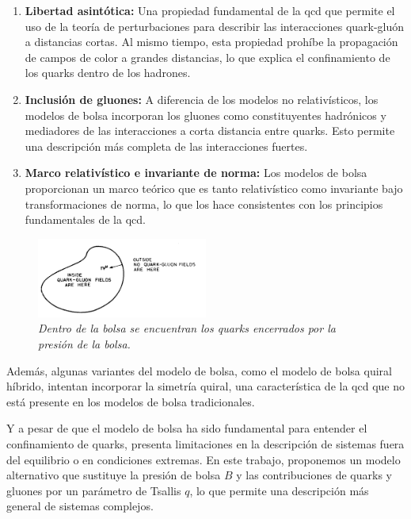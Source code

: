 \renewcommand{\labelenumi}{\alph{enumi})}

\begin{enumerate}
\item \textbf{Libertad asintótica:} Una propiedad fundamental de la \gls{qcd} que permite el uso de la teoría de perturbaciones para describir las interacciones quark-gluón a distancias cortas. Al mismo tiempo, esta propiedad prohíbe la propagación de campos de color a grandes distancias, lo que explica el confinamiento de los quarks dentro de los hadrones. %
\item \textbf{Inclusión de gluones:}  A diferencia de los modelos no relativísticos, los modelos de bolsa incorporan los gluones como constituyentes hadrónicos y mediadores de las interacciones a corta distancia entre quarks. Esto permite una descripción más completa de las interacciones fuertes. %
\item \textbf{Marco relativístico e invariante de norma:} Los modelos de bolsa proporcionan un marco teórico que es tanto relativístico como invariante bajo transformaciones de norma, lo que los hace consistentes con los principios fundamentales de la \gls{qcd}. %

\end{enumerate}

\begin{figure}
    \centering
    \includegraphics[width=0.5\textwidth]{./Images/Bag model BC.png}
    \caption[Diagrama de bolsa con condiciones de frontera]{\emph{Dentro de la bolsa se encuentran los quarks encerrados por la presión de la bolsa.}}
    \label{fig: Bolsa BC}
\end{figure}

Además, algunas variantes del modelo de bolsa, como el modelo de bolsa quiral híbrido, intentan incorporar la simetría quiral, una característica de la \gls{qcd} que no está presente en los modelos de bolsa tradicionales.%

Y a pesar de que el modelo de bolsa ha sido fundamental para entender el confinamiento de quarks, presenta limitaciones en la descripción de sistemas fuera del equilibrio o en condiciones extremas. En este trabajo, proponemos un modelo alternativo que sustituye la presión de bolsa $B$ y las contribuciones de quarks y gluones por un parámetro de Tsallis $q$, lo que permite una descripción más general de sistemas complejos.

